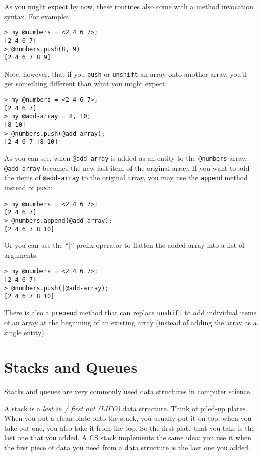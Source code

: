 As you might expect by now, these routines also come with a 
method invocation syntax. For example:

\begin{verbatim}
> my @numbers = <2 4 6 7>;
[2 4 6 7]
> @numbers.push(8, 9)
[2 4 6 7 8 9]
\end{verbatim}

Note, however, that if you {\tt push} or {\tt unshift} an 
array onto another array, you'll get something different 
than what you might expect:

\begin{verbatim}
> my @numbers = <2 4 6 7>;
[2 4 6 7]
> my @add-array = 8, 10;
[8 10]
> @numbers.push(@add-array);
[2 4 6 7 [8 10]]
\end{verbatim}

As you can see, when \verb'@add-array' is added as an entity 
to the \verb'@numbers' array, \verb'@add-array' becomes 
the new last item of the original array. If you want to 
add the items of \verb'@add-array' to the original array, 
you may use the {\tt append} method instead of {\tt push}:

\begin{verbatim}
> my @numbers = <2 4 6 7>;
[2 4 6 7]
> @numbers.append(@add-array);
[2 4 6 7 8 10]
\end{verbatim}

Or you can use the ``|'' prefix operator to flatten the 
added array into a list of arguments:

\begin{verbatim}
> my @numbers = <2 4 6 7>;
[2 4 6 7]
> @numbers.push(|@add-array);
[2 4 6 7 8 10]
\end{verbatim}

There is also a {\tt prepend} method that can replace 
{\tt unshift} to add individual items of an array at the 
beginning of an existing array (instead of adding the array 
as a single entity).


\section{Stacks and Queues}
\label{stacks_queues}

Stacks and queues are very commonly used data structures in 
computer science.

A stack is a \emph{last in / first out (LIFO)} data structure. Think of 
piled-up plates. When you put a clean plate onto the stack, 
you usually put it on top; when you take out one, you also 
take it from the top. So the first plate that you take 
is the last one that you added. A CS stack implements the same 
idea: you use it when the first piece of data you need from a 
data structure is the last one you added.

